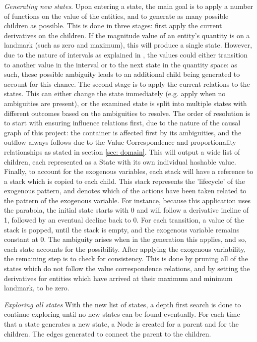 \textit{Generating new states}. Upon entering a state, the main goal is to apply
a number of functions on the value of the entities, and to generate as many
possible children as possible. This is done in three stages: first apply the
current derivatives on the children. If the magnitude value of an entity's
quantity is on a landmark (such as zero and maximum), this will produce a single
state. However, due to the nature of intervals as explained in
\cite{Bredeweg06garp3-}, the values could either transition to another value in
the interval or to the next state in the quantity space: as such, these possible
ambiguity leads to an additional child being generated to account for this
chance. The second stage is to apply the current relations to the states. This
can either change the state immediately (e.g. apply when no ambiguities are
present), or the examined state is split into multiple states with different
outcomes based on the ambiguities to resolve. The order of resolution is to
start with ensuring influence relations first, due to the nature of the causal
graph of this project: the container is affected first by its ambiguities, and
the outflow always follows due to the Value Correspondence and proportionality
relationships as stated in section \ref{sec: domain}. This will output a wide
list of children, each represented as a State with its own individual hashable
value. Finally, to account for the exogenous variables, each stack will have a
reference to a stack which is copied to each child. This stack represents the
'lifecycle' of the exogenous pattern, and denotes which of the actions have been
taken related to the pattern of the exogenous variable. For instance, because
this application uses the parabola, the initial state starts with 0 and will
follow a derivative incline of 1, followed by an eventual decline back to 0. For
each transition, a value of the stack is popped, until the stack is empty, and
the exogenous variable remains constant at 0. The ambiguity arises when in the
generation this applies, and so, each state accounts for the possibility. After
applying the exogenous variability, the remaining step is to check for
consistency. This is done by pruning all of the states which do not follow the
value correspondence relations, and by setting the derivatives for entities
which have arrived at their maximum and minimum landmark, to be zero.

\textit{Exploring all states}
With the new list of states, a depth first search is done to continue exploring
until no new states can be found eventually. For each time that a state
generates a new state, a Node is created for a parent and for the children. The
edges generated to connect the parent to the children.